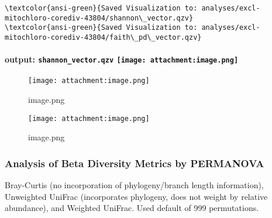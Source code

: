 \documentclass[11pt]{article}
\makeatletter
\def\maxwidth{\ifdim\Gin@nat@width>\linewidth\linewidth
    \else\Gin@nat@width\fi}
\let\Oldincludegraphics\includegraphics
\renewcommand{\includegraphics}[1]{\Oldincludegraphics[width=.8\maxwidth]{#1}}
\makeatother
\begin{document}
    \begin{Verbatim}[commandchars=\\\{\}]
\textcolor{ansi-green}{Saved Visualization to: analyses/excl-mitochloro-corediv-43804/shannon\_vector.qzv}
\textcolor{ansi-green}{Saved Visualization to: analyses/excl-mitochloro-corediv-43804/faith\_pd\_vector.qzv}

    \end{Verbatim}

    \hypertarget{output-shannon_vector.qzv-image.png}{%
\paragraph[output: \texttt{shannon\_vector.qzv}
]{\texorpdfstring{output: \texttt{shannon\_vector.qzv}
\protect\texttt{[image: attachment:image.png]}}{output: shannon\_vector.qzv image.png}}\label{output-shannon_vector.qzv-image.png}}

    \begin{figure}
\centering
\texttt{[image: attachment:image.png]}
\caption{image.png}
\end{figure}

    \begin{figure}
\centering
\texttt{[image: attachment:image.png]}
\caption{image.png}
\end{figure}

    \hypertarget{analysis-of-beta-diversity-metrics-by-permanova}{%
\subsubsection{Analysis of Beta Diversity Metrics by
PERMANOVA}\label{analysis-of-beta-diversity-metrics-by-permanova}}

Bray-Curtis (no incorporation of phylogeny/branch length information),
Unweighted UniFrac (incorporates phylogeny, does not weight by relative
abundance), and Weighted UniFrac. Used default of 999 permutations.
\end{document}
